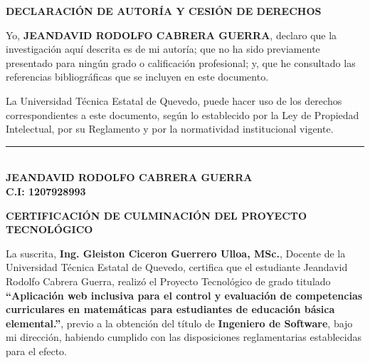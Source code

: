 \documentclass[12pt,a4paper,oneside]{report}
\begin{document}
\begin{center}
    \vspace*{0.5cm}
    {\bfseries DECLARACIÓN DE AUTORÍA Y CESIÓN DE DERECHOS}
\end{center}
\vspace{1cm}

\justifying
Yo, \textbf{JEANDAVID RODOLFO CABRERA GUERRA}, declaro que la investigación aquí descrita es de mi autoría; que no ha sido previamente presentado para ningún grado o calificación profesional; y, que he consultado las referencias bibliográficas que se incluyen en este documento.

\vspace{0.5cm}

La Universidad Técnica Estatal de Quevedo, puede hacer uso de los derechos correspondientes a este documento, según lo establecido por la Ley de Propiedad Intelectual, por su Reglamento y por la normatividad institucional vigente.

\vspace{4cm}

\begin{center}
    \rule{8cm}{0.4pt}\\[0.2cm]
    \textbf{JEANDAVID RODOLFO CABRERA GUERRA}\\
    \textbf{C.I: 1207928993}
\end{center}

\newpage

\begin{center}
    \vspace*{0.5cm}
    {\bfseries CERTIFICACIÓN DE CULMINACIÓN DEL PROYECTO TECNOLÓGICO}
\end{center}
\vspace{1cm}

\justifying
La suscrita, \textbf{Ing. Gleiston Ciceron Guerrero Ulloa, MSc.}, Docente de la Universidad Técnica Estatal de Quevedo, certifica que el estudiante Jeandavid Rodolfo Cabrera Guerra, realizó el Proyecto Tecnológico de grado titulado \textbf{``Aplicación web inclusiva para el control y evaluación de competencias curriculares en matemáticas para estudiantes de educación básica elemental.''}, previo a la obtención del título de \textbf{Ingeniero de Software}, bajo mi dirección, habiendo cumplido con las disposiciones reglamentarias establecidas para el efecto.
\end{document}
